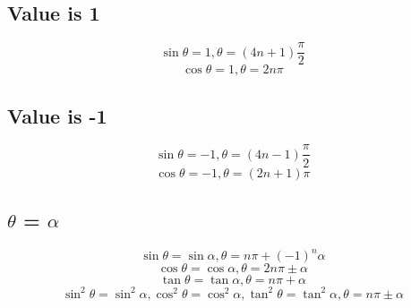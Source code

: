 \documentclass[fleqn, a4paper]{article}
\begin{document}
\subsection{Value is 1}
\[\sin\theta = 1, \theta = (4n+1)\frac{\pi}{2}\]
\[\cos\theta = 1, \theta = 2n\pi\]

\subsection{Value is -1}
\[\sin\theta = -1, \theta = (4n-1)\frac{\pi}{2}\]
\[\cos\theta = -1, \theta = (2n+1)\pi\]

\subsection{$\theta$ = $\alpha$}
\[\sin\theta = \sin\alpha, \theta = n\pi + (-1)^n\alpha\]
\[\cos\theta = \cos\alpha, \theta = 2n\pi\pm\alpha\]
\[\tan\theta = \tan\alpha, \theta = n\pi + \alpha\]
\[\]
\[\sin^2\theta = \sin^2\alpha, \cos^2\theta = \cos^2\alpha, \tan^2\theta =
\tan^2\alpha, \theta = n\pi\pm\alpha\]
\end{document}
